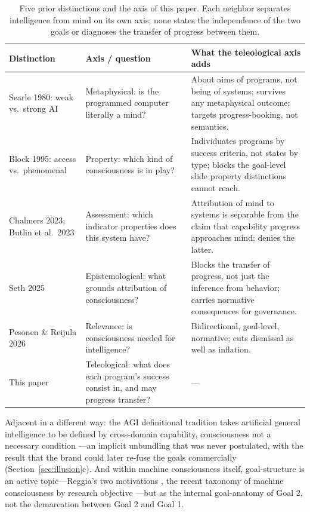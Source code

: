 \documentclass[10pt]{article}
\begin{document}
\begin{table}[t]
\centering
\small
\begin{tabularx}{\textwidth}{lYY}
\toprule
Distinction & Axis / question & What the teleological axis adds \\
\midrule
Searle 1980: weak vs.\ strong AI & Metaphysical: is the programmed computer literally a mind? & About aims of programs, not being of systems; survives any metaphysical outcome; targets progress-booking, not semantics. \\
Block 1995: access vs.\ phenomenal & Property: which kind of consciousness is in play? & Individuates programs by success criteria, not states by type; blocks the goal-level slide property distinctions cannot reach. \\
Chalmers 2023; Butlin et al.\ 2023 & Assessment: which indicator properties does this system have? & Attribution of mind to systems is separable from the claim that capability progress approaches mind; denies the latter. \\
Seth 2025 & Epistemological: what grounds attribution of consciousness? & Blocks the transfer of progress, not just the inference from behavior; carries normative consequences for governance. \\
Pesonen \& Reijula 2026 & Relevance: is consciousness needed for intelligence? & Bidirectional, goal-level, normative; cuts dismissal as well as inflation. \\
This paper & Teleological: what does each program's success consist in, and may progress transfer? & --- \\
\bottomrule
\end{tabularx}
\caption{Five prior distinctions and the axis of this paper. Each neighbor separates intelligence from mind on its own axis; none states the independence of the two goals or diagnoses the transfer of progress between them.}
\label{tab:axes}
\end{table}

Adjacent in a different way: the AGI definitional tradition takes artificial general intelligence to be defined by cross-domain capability, consciousness not a necessary condition \cite{goertzel2007agi}---an implicit unbundling that was never postulated, with the result that the brand could later re-fuse the goals commercially (Section~\ref{sec:illusion}c). And within machine consciousness itself, goal-structure is an active topic---Reggia's two motivations \cite{reggia2013rise}, the recent taxonomy of machine consciousness by research objective \cite{qin2025taxonomy}---but as the internal goal-anatomy of Goal 2, not the demarcation between Goal 2 and Goal 1.
\end{document}
